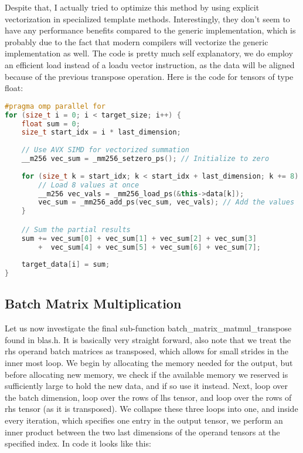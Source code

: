 \documentclass[sigconf]{acmart}
\renewcommand{\texttt}[1]{\begingroup\ttfamily\sloppy\hbadness=10000 #1\endgroup}
\begin{document}
Despite that, I actually tried to optimize this method by using explicit vectorization in specialized template methods. Interestingly, they don't seem to have any performance benefits compared to the generic implementation, which is probably due to the fact that modern compilers will vectorize the generic implementation as well. The code is pretty much self explanatory, we do employ an efficient \texttt{load} instead of a \texttt{loadu} vector instruction, as the data will be aligned because of the previous transpose operation. Here is the code for tensors of type \texttt{float}:

\begin{lstlisting}[language=C++]
#pragma omp parallel for
for (size_t i = 0; i < target_size; i++) {
    float sum = 0;
    size_t start_idx = i * last_dimension;
    
    // Use AVX SIMD for vectorized summation
    __m256 vec_sum = _mm256_setzero_ps(); // Initialize to zero
    
    for (size_t k = start_idx; k < start_idx + last_dimension; k += 8) {
        // Load 8 values at once
        __m256 vec_vals = _mm256_load_ps(&this->data[k]);
        vec_sum = _mm256_add_ps(vec_sum, vec_vals); // Add the values
    }

    // Sum the partial results
    sum += vec_sum[0] + vec_sum[1] + vec_sum[2] + vec_sum[3]
        +  vec_sum[4] + vec_sum[5] + vec_sum[6] + vec_sum[7];
    
    target_data[i] = sum;
}
\end{lstlisting}
\raggedbottom
\subsection{Batch Matrix Multiplication}
Let us now investigate the final sub-function \texttt{batch\_matrix\_matmul\_transpose} found in \texttt{blas.h}. It is basically very straight forward, also note that we treat the rhs operand batch matrices as transposed, which allows for small strides in the inner most loop. We begin by allocating the memory needed for the output, but before allocating new memory, we check if the available memory we reserved is sufficiently large to hold the new data, and if so use it instead. Next, loop over the batch dimension, loop over the rows of lhs tensor, and loop over the rows of rhs tensor (as it is transposed). We collapse these three loops into one, and inside every iteration, which specifies one entry in the output tensor, we perform an inner product between the two last dimensions of the operand tensors at the specified index. In code it looks like this:
\end{document}
